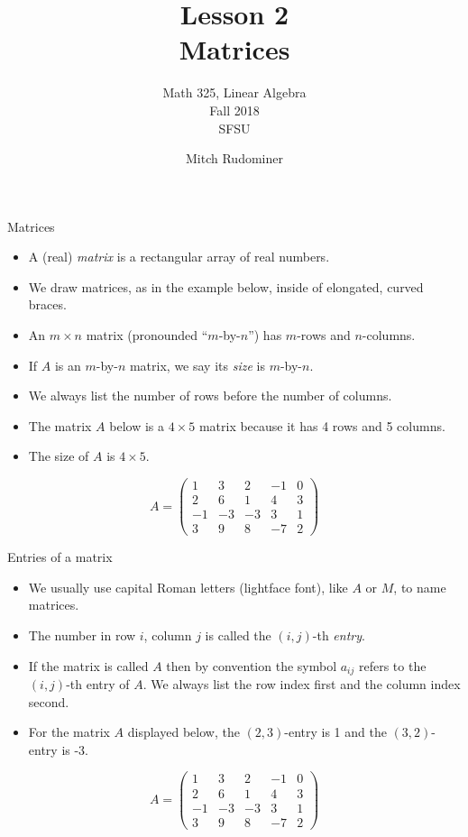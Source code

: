 \documentclass{beamer}
\title{Lesson 2 \\ Matrices}
\subtitle{Math 325, Linear Algebra \\ Fall 2018 \\ SFSU}
\author{Mitch Rudominer}
\date{}
\begin{document}
\begin{frame}
  \titlepage
\end{frame}



\begin{frame}{Matrices}

\begin{itemize}
\item A (real) \emph{matrix} is a rectangular array of real numbers.
\item We draw matrices, as in the example below, inside of elongated, curved
braces.
\item An $m\times n$ matrix (pronounded ``$m$-by-$n$'') has $m$-rows and $n$-columns.
\item If $A$ is an $m$-by-$n$ matrix, we say its \emph{size} is $m$-by-$n$.
\item We always list the number of rows before the number of columns.
\item The matrix $A$ below is a $4\times 5$ matrix because it has 4 rows
and 5 columns.
\item The size of $A$ is $4\times 5$.
\end{itemize}

$$
A =
\begin{pmatrix}
1 & 3 & 2 & -1 & 0 \\
2 & 6 & 1 & 4 & 3\\
-1 & -3 & -3 & 3 & 1 \\
3 & 9 & 8 & -7 & 2
\end{pmatrix}
$$

\end{frame}


\begin{frame}{Entries of a matrix}

\begin{itemize}
\item We usually use capital Roman letters (lightface font), like $A$ or $M$, to name matrices.
\item The number in row $i$, column $j$ is called the $(i,j)$-th \emph{entry}.
\item If the matrix is called $A$ then by convention the symbol $a_{ij}$ refers
to the $(i,j)$-th entry of $A$.
We always list the row index first and the column index second.
\item For the matrix $A$ displayed below, the $(2,3)$-entry is 1 and the
$(3,2)$-entry is -3.
\end{itemize}

$$
A =
\begin{pmatrix}
1 & 3 & 2 & -1 & 0 \\
2 & 6 & 1 & 4 & 3\\
-1 & -3 & -3 & 3 & 1 \\
3 & 9 & 8 & -7 & 2
\end{pmatrix}
$$

\end{frame}
\end{document}
